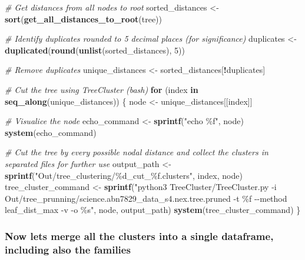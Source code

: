 \documentclass[
]{article}
\newenvironment{Shaded}{\begin{snugshade}}{\end{snugshade}}
\newcommand{\CommentTok}[1]{\textcolor[rgb]{0.56,0.35,0.01}{\textit{#1}}}
\newcommand{\ControlFlowTok}[1]{\textcolor[rgb]{0.13,0.29,0.53}{\textbf{#1}}}
\newcommand{\DecValTok}[1]{\textcolor[rgb]{0.00,0.00,0.81}{#1}}
\newcommand{\FunctionTok}[1]{\textcolor[rgb]{0.13,0.29,0.53}{\textbf{#1}}}
\newcommand{\NormalTok}[1]{#1}
\newcommand{\OtherTok}[1]{\textcolor[rgb]{0.56,0.35,0.01}{#1}}
\newcommand{\SpecialCharTok}[1]{\textcolor[rgb]{0.81,0.36,0.00}{\textbf{#1}}}
\newcommand{\StringTok}[1]{\textcolor[rgb]{0.31,0.60,0.02}{#1}}
\begin{document}
\begin{Shaded}
\begin{Highlighting}[]
\CommentTok{\# Get distances from all nodes to root}
\NormalTok{sorted\_distances }\OtherTok{\textless{}{-}} \FunctionTok{sort}\NormalTok{(}\FunctionTok{get\_all\_distances\_to\_root}\NormalTok{(tree))}

\CommentTok{\# Identify duplicates rounded to 5 decimal places (for significance)}
\NormalTok{duplicates }\OtherTok{\textless{}{-}} \FunctionTok{duplicated}\NormalTok{(}\FunctionTok{round}\NormalTok{(}\FunctionTok{unlist}\NormalTok{(sorted\_distances), }\DecValTok{5}\NormalTok{))}

\CommentTok{\# Remove duplicates}
\NormalTok{unique\_distances }\OtherTok{\textless{}{-}}\NormalTok{ sorted\_distances[}\SpecialCharTok{!}\NormalTok{duplicates]}

\CommentTok{\# Cut the tree using TreeCluster (bash)}
\ControlFlowTok{for}\NormalTok{ (index }\ControlFlowTok{in} \FunctionTok{seq\_along}\NormalTok{(unique\_distances)) \{}
\NormalTok{  node }\OtherTok{\textless{}{-}}\NormalTok{ unique\_distances[[index]]}
  
  \CommentTok{\# Visualice the node}
\NormalTok{  echo\_command }\OtherTok{\textless{}{-}} \FunctionTok{sprintf}\NormalTok{(}\StringTok{"echo \%f"}\NormalTok{, node)}
  \FunctionTok{system}\NormalTok{(echo\_command)}
    
  \CommentTok{\# Cut the tree by every possible nodal distance and collect the clusters in separated files for further use}
\NormalTok{  output\_path }\OtherTok{\textless{}{-}} \FunctionTok{sprintf}\NormalTok{(}\StringTok{"Out/tree\_clustering/\%d\_cut\_\%f.clusters"}\NormalTok{, index, node)}
\NormalTok{  tree\_cluster\_command }\OtherTok{\textless{}{-}} \FunctionTok{sprintf}\NormalTok{(}\StringTok{"python3 TreeCluster/TreeCluster.py {-}i Out/tree\_prunning/science.abn7829\_data\_s4.nex.tree.pruned {-}t \%f {-}{-}method leaf\_dist\_max {-}v {-}o \%s"}\NormalTok{, node, output\_path)}
  \FunctionTok{system}\NormalTok{(tree\_cluster\_command)}
\NormalTok{\}}
\end{Highlighting}
\end{Shaded}

\hypertarget{now-lets-merge-all-the-clusters-into-a-single-dataframe-including-also-the-families}{%
\subsubsection{Now lets merge all the clusters into a single dataframe,
including also the
families}\label{now-lets-merge-all-the-clusters-into-a-single-dataframe-including-also-the-families}}
\end{document}
